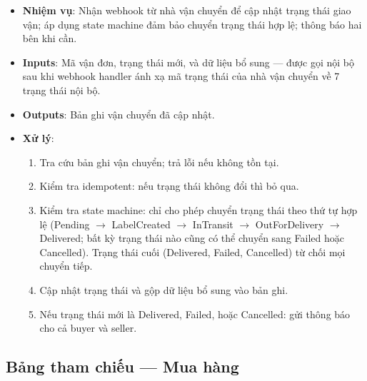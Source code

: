 \begin{itemize}[leftmargin=*]
  \item \textbf{Nhiệm vụ}: Nhận webhook từ nhà vận chuyển để cập nhật trạng thái giao vận; áp dụng state machine đảm bảo chuyển trạng thái hợp lệ; thông báo hai bên khi cần.
  \item \textbf{Inputs}: Mã vận đơn, trạng thái mới, và dữ liệu bổ sung --- được gọi nội bộ sau khi webhook handler ánh xạ mã trạng thái của nhà vận chuyển về 7 trạng thái nội bộ.
  \item \textbf{Outputs}: Bản ghi vận chuyển đã cập nhật.
  \item \textbf{Xử lý}:
    \begin{enumerate}
      \item Tra cứu bản ghi vận chuyển; trả lỗi nếu không tồn tại.
      \item Kiểm tra idempotent: nếu trạng thái không đổi thì bỏ qua.
      \item Kiểm tra state machine: chỉ cho phép chuyển trạng thái theo thứ tự hợp lệ (Pending $\to$ LabelCreated $\to$ InTransit $\to$ OutForDelivery $\to$ Delivered; bất kỳ trạng thái nào cũng có thể chuyển sang Failed hoặc Cancelled). Trạng thái cuối (Delivered, Failed, Cancelled) từ chối mọi chuyển tiếp.
      \item Cập nhật trạng thái và gộp dữ liệu bổ sung vào bản ghi.
      \item Nếu trạng thái mới là Delivered, Failed, hoặc Cancelled: gửi thông báo cho cả buyer và seller.
    \end{enumerate}
\end{itemize}

\subsection{Bảng tham chiếu --- Mua hàng}
\label{subsec:order-crossref}

